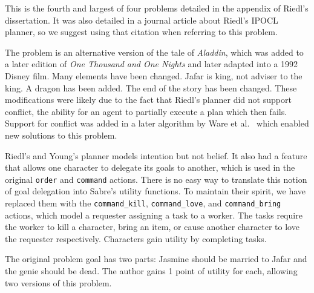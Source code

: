 \documentclass{nilreport}
\makeatletter
\renewcommand{\bibentry}[1]{\nocite{#1}{\frenchspacing\@nameuse{BR@r@#1\@extra@b@citeb}}}
\makeatother
\begin{document}
This is the fourth and largest of four problems detailed in the appendix
of Riedl's dissertation. It was also detailed in a journal article
about Riedl's IPOCL planner, so we suggest using that citation when
referring to this problem.

\begin{quote}
	\bibentry{riedl2010narrative}
\end{quote}

\noindent The problem is an alternative version of the tale of \emph{Aladdin},
which was added to a later edition of \emph{One Thousand and One Nights}
and later adapted into a 1992 Disney film. Many elements have been
changed. Jafar is king, not adviser to the king. A dragon has been
added. The end of the story has been changed. These modifications
were likely due to the fact that Riedl's planner did not support conflict,
the ability for an agent to partially execute a plan which then fails.
Support for conflict was added in a later algorithm by Ware et al.~\cite{ware2014conflict}
which enabled new solutions to this problem.

Riedl's and Young's planner models intention but not belief. It also
had a feature that allows one character to delegate its goals to another,
which is used in the original \texttt{order} and \texttt{command}
actions. There is no easy way to translate this notion of goal delegation
into Sabre's utility functions. To maintain their spirit, we have
replaced them with the \texttt{command\_kill}, \texttt{command\_love},
and \texttt{command\_bring} actions, which model a requester assigning
a task to a worker. The tasks require the worker to kill a character,
bring an item, or cause another character to love the requester respectively.
Characters gain utility by completing tasks.

The original problem goal has two parts: Jasmine should be married
to Jafar and the genie should be dead. The author gains 1 point of
utility for each, allowing two versions of this problem.

\medskip{}
\noindent{}
\end{document}

